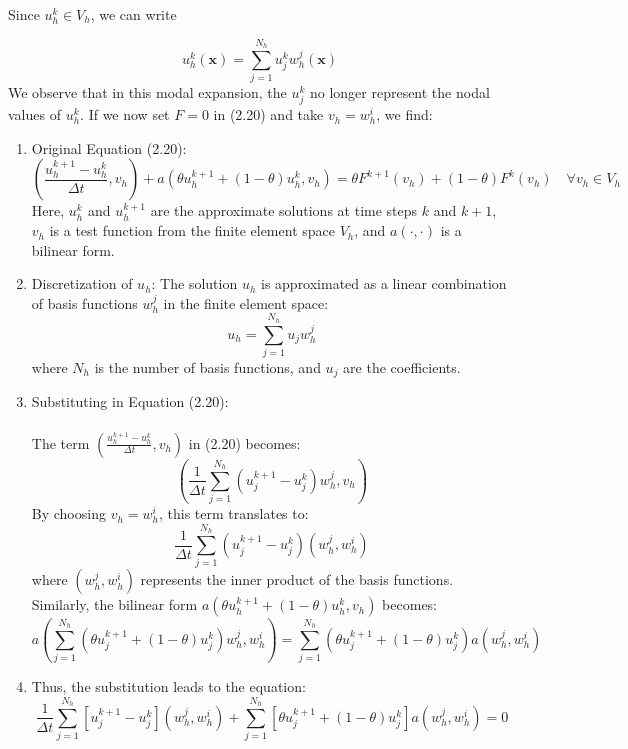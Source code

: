 \documentclass[11pt]{book}
\begin{document}
Since $u_{h}^{k} \in V_{h}$, we can write

$$
u_{h}^{k}(\mathbf{x})=\sum_{j=1}^{N_{h}} u_{j}^{k} w_{h}^{j}(\mathbf{x})
$$
We observe that in this modal expansion, the $u_{j}^{k}$ no longer represent the nodal values of $u_{h}^{k}$.
If we now set $F=0$ in (2.20) and take $v_{h}=w_{h}^{i}$, we find:
\begin{enumerate}
    \item Original Equation (2.20):
    \[
    \left(\frac{u_h^{k+1} - u_h^k}{\Delta t}, v_h\right) + a\left(\theta u_h^{k+1} + (1-\theta) u_h^{k}, v_h\right) = \theta F^{k+1}(v_h) + (1-\theta) F^k(v_h) \quad \forall v_h \in V_h
    \]
    Here, \(u_h^{k}\) and \(u_h^{k+1}\) are the approximate solutions at time steps \(k\) and \(k+1\), \(v_h\) is a test function from the finite element space \(V_h\), and \(a(\cdot, \cdot)\) is a bilinear form.

    \item Discretization of \(u_h\):
    The solution \(u_h\) is approximated as a linear combination of basis functions \(w_h^j\) in the finite element space:
    \[
    u_h = \sum_{j=1}^{N_h} u_j w_h^j
    \]
    where \(N_h\) is the number of basis functions, and \(u_j\) are the coefficients.

    \item Substituting in Equation (2.20):\\ \\
    The term \(\left(\frac{u_h^{k+1} - u_h^k}{\Delta t}, v_h\right)\) in (2.20) becomes:
    \[
    \left(\frac{1}{\Delta t} \sum_{j=1}^{N_h} (u_j^{k+1} - u_j^k) w_h^j, v_h\right)
    \]
    By choosing \(v_h = w_h^i\), this term translates to:
    \[
    \frac{1}{\Delta t} \sum_{j=1}^{N_h} (u_j^{k+1} - u_j^k) (w_h^j, w_h^i)
    \]
    where \((w_h^j, w_h^i)\) represents the inner product of the basis functions.\\ 
    Similarly, the bilinear form \(a(\theta u_h^{k+1} + (1-\theta) u_h^{k}, v_h)\) becomes:
    \[
    a\left(\sum_{j=1}^{N_h} (\theta u_j^{k+1} + (1-\theta) u_j^k) w_h^j, w_h^i\right) = \sum_{j=1}^{N_h} (\theta u_j^{k+1} + (1-\theta) u_j^k) a(w_h^j, w_h^i)
    \]

    \item Thus, the substitution leads to the equation:
    \[
    \frac{1}{\Delta t} \sum_{j=1}^{N_h}[u_j^{k+1} - u_j^k](w_h^j, w_h^i) + \sum_{j=1}^{N_h}[\theta u_j^{k+1} + (1-\theta) u_j^k] a(w_h^j, w_h^i) = 0
    \]
\end{enumerate}
\end{document}

